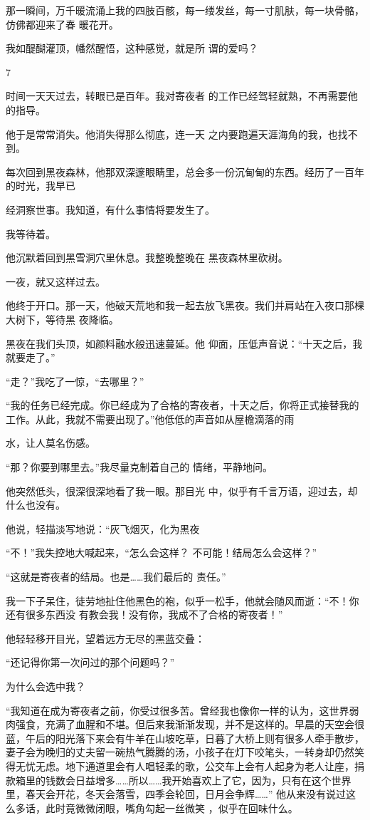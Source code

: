 \documentclass{article}
\begin{document}
那一瞬间，万千暖流涌上我的四肢百骸，每一缕发丝，每一寸肌肤，每一块骨骼，仿佛都迎来了春
暖花开。 

我如醍醐灌顶，幡然醒悟，这种感觉，就是所
谓的爱吗？ 


7 

时间一天天过去，转眼已是百年。我对寄夜者
的工作已经驾轻就熟，不再需要他的指导。 

他于是常常消失。他消失得那么彻底，连一天
之内要跑遍天涯海角的我，也找不到。 

每次回到黑夜森林，他那双深邃眼睛里，总会多一份沉甸甸的东西。经历了一百年的时光，我早已
\newpage

经洞察世事。我知道，有什么事情将要发生了。 


我等待着。 

他沉默着回到黑雪洞穴里休息。我整晚整晚在
黑夜森林里砍树。 


一夜，就又这样过去。 

他终于开口。那一天，他破天荒地和我一起去放飞黑夜。我们并肩站在入夜口那棵大树下，等待黑
夜降临。 

黑夜在我们头顶，如颜料融水般迅速蔓延。他
仰面，压低声音说：“十天之后，我就要走了。” 


“走？”我吃了一惊，“去哪里？” 

“我的任务已经完成。你已经成为了合格的寄夜者，十天之后，你将正式接替我的工作。从此，我就不需要出现了。”他低低的声音如从屋檐滴落的雨
\newpage

水，让人莫名伤感。 

“那？你要到哪里去。”我尽量克制着自己的
情绪，平静地问。 

他突然低头，很深很深地看了我一眼。那目光
中，似乎有千言万语，迎过去，却什么也没有。 

他说，轻描淡写地说：“灰飞烟灭，化为黑夜

“不！”我失控地大喊起来，“怎么会这样？
不可能！结局怎么会这样？” 

“这就是寄夜者的结局。也是……我们最后的
责任。” 

我一下子呆住，徒劳地扯住他黑色的袍，似乎一松手，他就会随风而逝：“不！你还有很多东西没
有教会我！没有你，我成不了合格的寄夜者！” 

他轻轻移开目光，望着远方无尽的黑蓝交叠：
\newpage

“还记得你第一次问过的那个问题吗？” 


为什么会选中我？ 

“我知道在成为寄夜者之前，你受过很多苦。曾经我也像你一样的认为，这世界弱肉强食，充满了血腥和不堪。但后来我渐渐发现，并不是这样的。早晨的天空会很蓝，午后的阳光落下来会有牛羊在山坡吃草，日暮了大桥上则有很多人牵手散步，妻子会为晚归的丈夫留一碗热气腾腾的汤，小孩子在灯下咬笔头，一转身却仍然笑得无忧无虑。地下通道里会有人唱轻柔的歌，公交车上会有人起身为老人让座，捐款箱里的钱数会日益增多……所以……我开始喜欢上了它，因为，只有在这个世界里，春天会开花，冬天会落雪，四季会轮回，日月会争辉……” 他从来没有说过这么多话，此时竟微微闭眼，嘴角勾起一丝微笑
，似乎在回味什么。 
\end{document}
